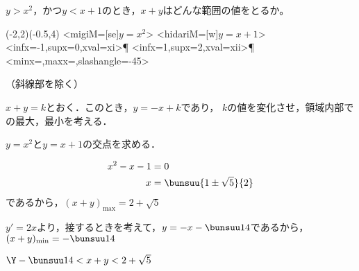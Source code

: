 \begin{problem}
$y>x^2$，かつ$y<x+1$のとき，$x+y$はどんな範囲の値をとるか。
\end{problem}

\begin{center}
  \begin{pszahyou}[ul=10mm](-2,2)(-0.5,4)
  \YGraph<migiM=[se]{$y=x^2$}>{\Fx}
  \YGraph<hidariM=[w]{$y=x+1$}>{\Gx}
  \YandY<infx=-1,supx=0,xval=xi>\Fx\Gx\P
  \YandY<infx=1,supx=2,xval=xii>\Fx\Gx\P
  \YPaintii*<minx=\xi,maxx=\xii,slashangle=-45>\Fx\Gx
\end{pszahyou}

（斜線部を除く）
\end{center}


\vspace{1zw}

$x+y = k$とおく．このとき，$y = -x + k$であり，
$k$の値を変化させ，領域内部での最大，最小を考える．

$y = x^2$と$y = x+1$の交点を求める．

\begin{align*}
  x^2 - x - 1 &= 0\\
  x &= \bunsuu{1 \pm \sqrt5}{2}
\end{align*}
であるから，$(x+y)_{\mathrm{max}} = 2+\sqrt5$

$y' = 2x$より，接するときを考えて，$y = -x - \bunsuu14$であるから，
$(x+y)_{\mathrm{min}} = -\bunsuu14$

$\Y -\bunsuu14 < x + y < 2 + \sqrt5$
